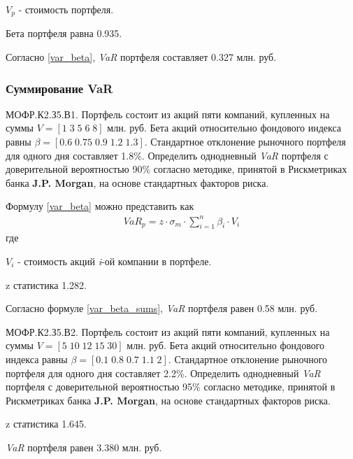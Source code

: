 \documentclass[12pt, table, a4paper,twoside]{exam}
\begin{document}
\begin{questions}
\begin{solution}[12em]
$V_p$ - стоимость портфеля.

Бета портфеля равна 0.935.

Согласно \eqref{var_beta}, \textit{VaR} портфеля составляет 0.327 млн. руб.
\end{solution}


\subsubsection{Суммирование VaR}
\question[10] МОФР.К2.З5.В1. Портфель состоит из акций пяти компаний, купленных на суммы   $V=[1\;3\;5\;6\;8]$ млн. руб. Бета акций относительно фондового индекса равны $\beta=[0.6\;0.75\;0.9\;1.2\;1.3]$. Стандартное отклонение рыночного портфеля для одного дня составляет 1.8\%. Определить однодневный  \textit{VaR }портфеля с доверительной вероятностью 90\% согласно методике, принятой в Рискметриках банка \textbf{J.P. Morgan}, на основе стандартных факторов риска. 

\begin{solution}[4em]

\raggedright
Формулу \eqref{var_beta} можно представить как
\begin{align}
\label{var_beta_sums}
VaR_p=z \cdot \sigma_m \cdot \sum_{i=1}^n\beta_i \cdot V_i
\end{align}
где

$V_i$ - стоимость акций \textit{i}-ой компании в портфеле.

z статистика 1.282.	

Согласно формуле \eqref{var_beta_sums}, \textit{VaR }портфеля равен 0.58 млн. руб.
\end{solution}

\question[10] МОФР.К2.З5.В2. Портфель состоит из акций пяти компаний, купленных на суммы   $V=[5\;10\;12\;15\;30]$ млн. руб. Бета акций относительно фондового индекса равны $\beta=[0.1\;0.8\;0.7\;1.1\;2]$. Стандартное отклонение рыночного портфеля для одного дня составляет 2.2\%. Определить однодневный  \textit{VaR }портфеля с доверительной вероятностью 95\% согласно методике, принятой в Рискметриках банка \textbf{J.P. Morgan}, на основе стандартных факторов риска. 

\begin{solution}[4em]
	
	\raggedright
	z статистика 1.645.	
	
	\textit{VaR } портфеля равен 3.380 млн. руб.
\end{solution}

\vfill\null\cleardoublepage

\end{questions}
\end{document}
